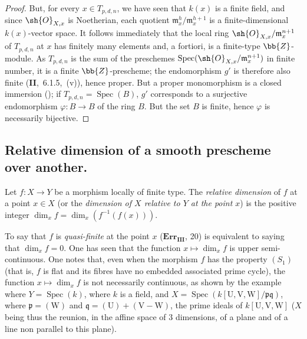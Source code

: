 \begin{proof}
But, for every $x\in T_{p,d,n}$, we have seen that $k(x)$ is a finite field, and since $\sh{O}_{X,x}$ is Noetherian, each quotient $\mathfrak{m}_x^h/\mathfrak{m}_x^{h+1}$ is a finite-dimensional $k(x)$-vector space.
It follows immediately that the local ring $\sh{O}_{X,x}/\mathfrak{m}_x^{n+1}$ of $T_{p,d,n}$ at $x$ has finitely many elements and, a fortiori, is a finite-type $\bb{Z}$-module.
As $T_{p,d,n}$ is the sum of the preschemes $\operatorname{Spec}(\sh{O}_{X,x}/\mathfrak{m}_x^{n+1})$ in finite number, it is a finite $\bb{Z}$-prescheme; the endomorphism $g'$ is therefore also finite (\textbf{II},~6.1.5,~(v)), hence proper.
But a proper monomorphism is a closed immersion (); if $T_{p,d,n}=\operatorname{Spec}(B)$, $g'$ corresponds to a surjective endomorphism $\varphi:B\to B$ of the ring $B$.
But the set $B$ is finite, hence $\varphi$ is necessarily bijective.
\end{proof}


\subsection{Relative dimension of a smooth prescheme over another.}
\label{subsection:IV.17.10}

\begin{definition}[17.10.1]
\label{IV.17.10.1}
Let $f:X\to Y$ be a morphism locally of finite type.
The \emph{relative dimension} of $f$ at a point $x\in X$ (or the \emph{dimension of $X$ relative to $Y$ at the point $x$}) is the positive integer $\dim_x f=\dim_x(f^{-1}(f(x)))$.
\end{definition}

To say that $f$ is \emph{quasi-finite} at the point $x$ ($\mathbf{Err_{III}}$, 20) is equivalent to saying that $\dim_x f=0$.
One has seen  that the function $x\mapsto\dim_x f$ is upper semi-continuous.
One notes that, even when the morphism $f$ has the property $(S_1)$ (that is, $f$ is flat  and its fibres have no embedded associated prime cycle), the function $x\mapsto\dim_x f$ is not necessarily continuous, as shown by the example where $Y=\operatorname{Spec}(k)$, where $k$ is a field, and $X=\operatorname{Spec}(k[\mathrm{U},\mathrm{V},\mathrm{W}]/\mathfrak{p}\mathfrak{q})$, where $\mathfrak{p}=(\mathrm{W})$ and $\mathfrak{q}=(\mathrm{U})+(\mathrm{V}-\mathrm{W})$, the prime ideals of $k[\mathrm{U},\mathrm{V},\mathrm{W}]$ ($X$ being thus the reunion, in the affine space of $3$ dimensions, of a plane and of a line non parallel to this plane).

